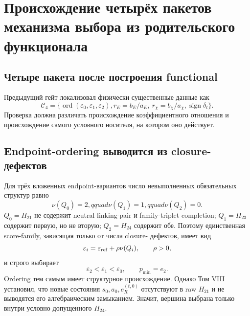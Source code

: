 \chapter{Происхождение четырёх пакетов механизма выбора из родительского функционала}
\label{ch:v9-four-slot-coefficient-origin}

\section{Четыре пакета после построения functional}

Предыдущий гейт локализовал физически существенные данные как
\begin{equation}
 \mathcal C_4=
 \{\operatorname{ord}(\varepsilon_0,\varepsilon_1,\varepsilon_2),
 r_E=b_E/a_E,\ r_\chi=b_\chi/a_\chi,
 \operatorname{sign}\delta_t\}.
 \label{eq:v9-origin-four-packages}
\end{equation}
Проверка должна различать происхождение коэффициентного отношения и
происхождение самого условного носителя, на котором оно действует.

\section{Endpoint-ordering выводится из closure-дефектов}

Для трёх вложенных endpoint-вариантов число невыполненных обязательных
структур равно
\begin{equation}
 \nu(Q_0)=2,qquad \nu(Q_1)=1,qquad \nu(Q_2)=0.
 \label{eq:v9-origin-endpoint-violations}
\end{equation}
$Q_0=H_{21}$ не содержит neutral linking-pair и family-triplet completion;
$Q_1=H_{23}$ содержит первую, но не вторую; $Q_2=H_{24}$ содержит обе.
Поэтому единственная score-family, зависящая только от числа closure-
дефектов, имеет вид
\begin{equation}
 \varepsilon_i=\varepsilon_{\rm ref}+\rho\nu(Q_i),
 \qquad \rho>0,
 \label{eq:v9-origin-endpoint-score}
\end{equation}
и строго выбирает
\begin{equation}
 \varepsilon_2<\varepsilon_1<\varepsilon_0,
 \qquad p_{\min}=e_2.
 \label{eq:v9-origin-endpoint-order}
\end{equation}
Ordering тем самым имеет структурное происхождение. Однако Том VIII
установил, что новые состояния $s_0,a_0,e_R^{(t,0)}$ отсутствуют в raw
$H_{21}$ и не выводятся его алгебраическим замыканием. Значит, вершина
выбрана только внутри условно допущенного $H_{24}$.

